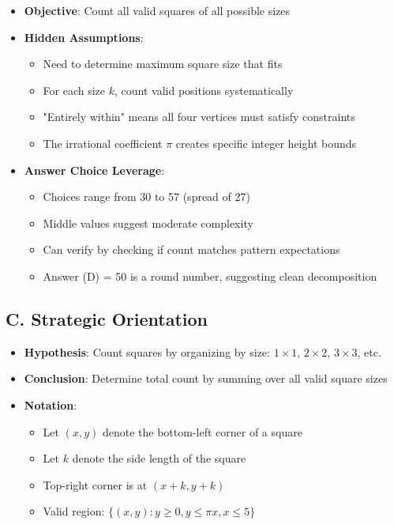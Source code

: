 \documentclass[12pt]{article}
\begin{document}
\begin{problemconfigbox}
\begin{itemize}[leftmargin=*]
    \item \textbf{Objective}: Count all valid squares of all possible sizes
    
    \item \textbf{Hidden Assumptions}: 
    \begin{itemize}
        \item Need to determine maximum square size that fits
        \item For each size $k$, count valid positions systematically
        \item "Entirely within" means all four vertices must satisfy constraints
        \item The irrational coefficient $\pi$ creates specific integer height bounds
    \end{itemize}
    
    \item \textbf{Answer Choice Leverage}: 
    \begin{itemize}
        \item Choices range from 30 to 57 (spread of 27)
        \item Middle values suggest moderate complexity
        \item Can verify by checking if count matches pattern expectations
        \item Answer (D) = 50 is a round number, suggesting clean decomposition
    \end{itemize}
\end{itemize}

\subsection*{C. Strategic Orientation}
\begin{itemize}[leftmargin=*]
    \item \textbf{Hypothesis}: Count squares by organizing by size: $1 \times 1$, $2 \times 2$, $3 \times 3$, etc.
    
    \item \textbf{Conclusion}: Determine total count by summing over all valid square sizes
    
    \item \textbf{Notation}: 
    \begin{itemize}
        \item Let $(x, y)$ denote the bottom-left corner of a square
        \item Let $k$ denote the side length of the square
        \item Top-right corner is at $(x+k, y+k)$
        \item Valid region: $\{(x,y) : y \geq 0, y \leq \pi x, x \leq 5\}$
    \end{itemize}
    

\end{itemize}
\end{problemconfigbox}
\end{document}

